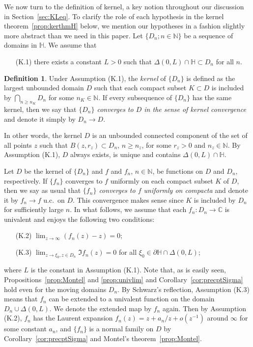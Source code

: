\documentclass[preprint,12pt]{elsarticle}
\theoremstyle{definition}
\newtheorem{dfn}[thm]{Definition}
\newcommand{\C}{\mathbb{C}}
\newcommand{\N}{\mathbb{N}}
\newcommand{\uhp}{\mathbb{H}}
\begin{document}
We now turn to the definition of kernel,
a key notion throughout our discussion in Section~\ref{sec:KLeq}.
To clarify the role of each hypothesis
in the kernel theorem~\ref{prop:kerthmH} below,
we mention our hypotheses in a fashion slightly more abstract
than we need in this paper.
Let $\{D_n; n \in \N\}$ be a sequence of domains in $\uhp$.
We assume that
\begin{enumerate}
\item[(K.1)] there exists a constant $L>0$ such that
$\Delta(0, L) \cap \uhp \subset D_n$ for all $n$.
\end{enumerate}

\begin{dfn} \label{def:kernel}
Under Assumption (K.1), the \emph{kernel} of $\{D_n\}$ is defined
as the largest unbounded domain $D$ such that
each compact subset $K \subset D$ is included by $\bigcap_{n \geq n_K}D_n$
for some $n_K \in \N$.
If every subsequence of $\{D_n\}$ has the same kernel,
then we say that \emph{$\{D_n\}$ converges to $D$
in the sense of kernel convergence} and denote it simply by $D_n \to D$.
\end{dfn}

In other words, the kernel $D$ is an unbounded connected component of the set
of all points $z$ such that $B(z, r_z) \subset D_n$, $n \geq n_z$, for some $r_z>0$
and $n_z \in \N$. By Assumption (K.1),
$D$ always exists, is unique and contains $\Delta(0, L) \cap \uhp$.

Let $D$ be the kernel of $\{D_n\}$ and $f$ and $f_n$, $n \in \N$, be functions on $D$ and $D_n$, respectively.
If $\{f_n\}$ converges to $f$ uniformly on each compact subset $K$ of $D$,
then we say as usual that \emph{$\{f_n\}$ converges to $f$
uniformly on compacta} and denote it by $f_n \to f$ u.c.\ on $D$.
This convergence makes sense since $K$ is included by $D_n$
for sufficiently large $n$.
In what follows, we assume that each $f_n \colon D_n \to \C$ is univalent
and enjoys the following two conditions:
\begin{enumerate}
\item[(K.2)]
$\lim_{z \to \infty}(f_n(z)-z)=0$;
\item[(K.3)]
$\lim_{z \to \xi_0, z \in D_n} \Im f_n(z)=0$
for all $\xi_0 \in \partial \uhp \cap \Delta(0, L)$;
\end{enumerate}
where $L$ is the constant in Assumption (K.1).
Note that, as is easily seen, Propositions~\ref{prop:Montel} and \ref{prop:univlim}
and Corollary~\ref{cor:precptSigma} hold even for the moving domains $D_n$.
By Schwarz's reflection, Assumption (K.3) means that $f_n$ can be extended
to a univalent function on the domain $D_n \cup \Delta(0, L)$.
We denote the extended map by $f_n$ again.
Then by Assumption (K.2),
$f_n$ has the Laurent expansion
$f_n(z)=z+a_n/z+o(z^{-1})$ around $\infty$ for some constant $a_n$,
and $\{f_n\}$ is a normal family on $D$ by Corollary~\ref{cor:precptSigma}
and Montel's theorem~\ref{prop:Montel}.
\end{document}

